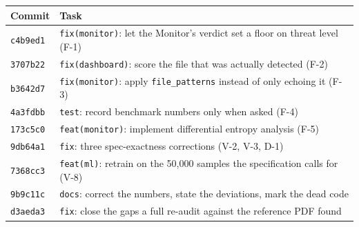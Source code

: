 \documentclass[11pt,a4paper]{article}
\begin{document}
\begin{center}
\begin{tabularx}{\linewidth}{@{}P{2.3cm}L@{}}
\toprule
\textbf{Commit} & \textbf{Task} \\
\midrule
\texttt{c4b9ed1} & \texttt{fix(monitor)}: let the Monitor's verdict set a floor on threat level (F-1) \\
\texttt{3707b22} & \texttt{fix(dashboard)}: score the file that was actually detected (F-2) \\
\texttt{b3642d7} & \texttt{fix(monitor)}: apply \texttt{file\_patterns} instead of only echoing it (F-3) \\
\texttt{4a3fdbb} & \texttt{test}: record benchmark numbers only when asked (F-4) \\
\texttt{173c5c0} & \texttt{feat(monitor)}: implement differential entropy analysis (F-5) \\
\texttt{9db64a1} & \texttt{fix}: three spec-exactness corrections (V-2, V-3, D-1) \\
\texttt{7368cc3} & \texttt{feat(ml)}: retrain on the 50,000 samples the specification calls for (V-8) \\
\texttt{9b9c11c} & \texttt{docs}: correct the numbers, state the deviations, mark the dead code \\
\texttt{d3aeda3} & \texttt{fix}: close the gaps a full re-audit against the reference PDF found \\
\bottomrule
\end{tabularx}
\end{center}
\end{document}
